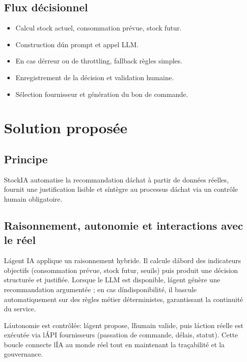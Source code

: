 \documentclass[12pt,a4paper]{report}
\begin{document}
\section{Flux d\'ecisionnel}
\begin{itemize}
  \item Calcul stock actuel, consommation pr\'evue, stock futur.
  \item Construction d\'un prompt et appel LLM.
  \item En cas d\'erreur ou de throttling, fallback r\`egles simples.
  \item Enregistrement de la d\'ecision et validation humaine.
  \item S\'election fournisseur et g\'en\'eration du bon de commande.
\end{itemize}

\cleardoublepage

\chapter{Solution propos\'ee}
\section{Principe}
StockIA automatise la recommandation d\'achat \`a partir de donn\'ees r\'eelles, fournit une justification lisible et s\'int\`egre au processus d\'achat via un contr\^ole humain obligatoire.

\section{Raisonnement, autonomie et interactions avec le r\'eel}
L\'agent IA applique un raisonnement hybride. Il calcule d\'abord des indicateurs objectifs (consommation pr\'evue, stock futur, seuils) puis produit une d\'ecision structur\'ee et justifi\'ee. Lorsque le LLM est disponible, l\'agent g\'en\`ere une recommandation argument\'ee ; en cas d\'indisponibilit\'e, il bascule automatiquement sur des r\`egles m\'etier d\'eterministes, garantissant la continuit\'e du service.

L\'autonomie est contr\^ol\'ee: l\'agent propose, l\'humain valide, puis l\'action r\'eelle est ex\'ecut\'ee via l\'API fournisseurs (passation de commande, d\'elais, statut). Cette boucle connecte l\'IA au monde r\'eel tout en maintenant la tra\c{c}abilit\'e et la gouvernance.
\end{document}
